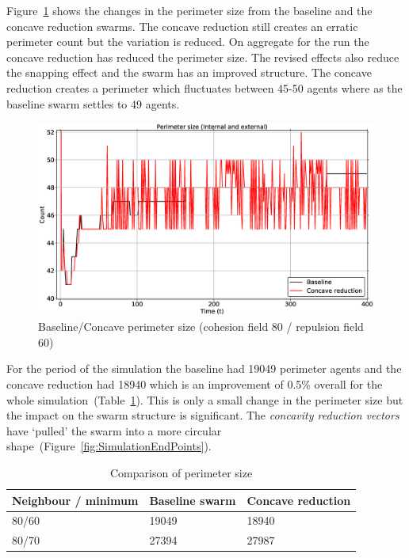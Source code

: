 Figure~\ref{concave:BaselineConcavePerimeter8060} shows the changes in the perimeter size from the baseline and the concave reduction swarms. The concave reduction still creates an erratic perimeter count but the variation is reduced. On aggregate for the run the concave reduction has reduced the perimeter size. The revised effects also reduce the snapping effect and the swarm has an improved structure. The concave reduction creates a perimeter which fluctuates between 45-50 agents where as the baseline swarm settles to 49 agents.
 
\begin{figure}[H]
\begin{center}
\includegraphics[width=14cm]{CHAPTER-7/figures/BaselineConcavePerimeter8060}
\end{center}
\caption{Baseline/Concave perimeter size (cohesion field 80 / repulsion field 60)\label{concave:BaselineConcavePerimeter8060}}
\end{figure}

For the period of the simulation the baseline had 19049 perimeter agents and the concave reduction had 18940 which is an improvement of 0.5\% overall for the whole simulation~(Table~\ref{tab:BaselineConcaveComparison}). This is only a small change in the perimeter size but the impact on the swarm structure is significant. The \textit{concavity reduction vectors} have `pulled' the swarm into a more circular shape~(Figure~\ref{fig:SimulationEndPoints}).

\begin{table}[H]
\begin{center}
\begin{tabular}{| p{2.3cm} | p{2cm} | p{2cm} |}
\hline
\bf Neighbour / minimum & \bf Baseline \bf swarm & \bf Concave \bf reduction \\ \hline
80/60 & 19049 & 18940 \\  \hline
80/70 & 27394 & 27987 \\  \hline
\end{tabular}\caption{Comparison of perimeter size} \label{tab:BaselineConcaveComparison}
\end{center}
\end{table}

